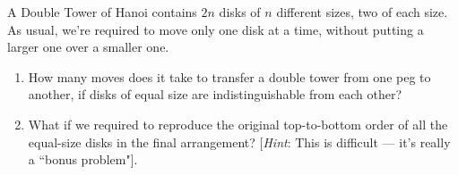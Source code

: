 \documentclass[12pt]{article}
\newenvironment{ex}[2][Exercise]{\begin{trivlist}
		\item[\hskip \labelsep {\bfseries #1}\hskip \labelsep {\bfseries #2.}]}{\end{trivlist}}
\begin{document}
\begin{ex}{11}
	A Double Tower of Hanoi contains $2n$ disks of $n$ different sizes, two of each size.
	As usual, we're required to move only one disk at a time, without putting a larger one
	over a smaller one.
	\begin{enumerate}[label=(\alph*)]
		\item How many moves does it take to transfer a double tower from one peg to another,
		if disks of equal size are indistinguishable from each other?
		\item What if we required to reproduce the original top-to-bottom
		order of all the equal-size disks in the final arrangement?
		[\emph{Hint}: This is difficult --- it's really a ``bonus problem"].
	\end{enumerate}
\end{ex}
\end{document}
